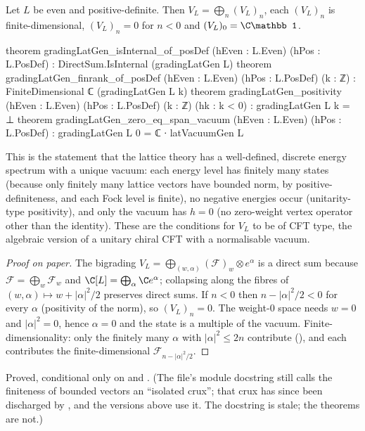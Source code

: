 \begin{theorem}\label{ch03:thm:gradingLat}
Let $L$ be even and positive-definite. Then $V_L=\bigoplus_n(V_L)_n$, each $(V_L)_n$ is
finite-dimensional, $(V_L)_n=0$ for $n<0$ and $(V_L)_0=\C\mathbb 1$.
\end{theorem}
\begin{leancode}
theorem gradingLatGen_isInternal_of_posDef (hEven : L.Even) (hPos : L.PosDef) :
    DirectSum.IsInternal (gradingLatGen L)
theorem gradingLatGen_finrank_of_posDef (hEven : L.Even) (hPos : L.PosDef) (k : ℤ) :
    FiniteDimensional ℂ (gradingLatGen L k)
theorem gradingLatGen_positivity (hEven : L.Even) (hPos : L.PosDef) (k : ℤ) (hk : k < 0) :
    gradingLatGen L k = ⊥
theorem gradingLatGen_zero_eq_span_vacuum (hEven : L.Even) (hPos : L.PosDef) :
    gradingLatGen L 0 = ℂ ∙ latVacuumGen L
\end{leancode}

\begin{physics}
This is the statement that the lattice theory has a well-defined, discrete energy spectrum with a unique vacuum: each energy level has finitely many states (because only finitely many lattice vectors have bounded norm, by positive-definiteness, and each Fock level is finite), no negative energies occur (unitarity-type positivity), and only the vacuum has $h=0$ (no zero-weight vertex operator other than the identity). These are the conditions for $V_L$ to be of CFT type, the algebraic version of a unitary chiral CFT with a normalisable vacuum.
\end{physics}
\begin{proof}[Proof on paper]
The bigrading $V_L=\bigoplus_{(w,\alpha)}(\mathcal F)_w\otimes e^\alpha$ is a direct sum because
$\mathcal F=\bigoplus_w\mathcal F_w$ and $\C[L]=\bigoplus_\alpha\C e^\alpha$; collapsing along the
fibres of $(w,\alpha)\mapsto w+|\alpha|^2/2$ preserves direct sums. If $n<0$ then
$n-|\alpha|^2/2<0$ for every $\alpha$ (positivity of the norm), so $(V_L)_n=0$. The weight-$0$
space needs $w=0$ and $|\alpha|^2=0$, hence $\alpha=0$ and the state is a multiple of the vacuum.
Finite-dimensionality: only the finitely many $\alpha$ with $|\alpha|^2\le2n$ contribute
(), and each contributes the finite-dimensional $\mathcal F_{n-|\alpha|^2/2}$.
\end{proof}
\begin{status}
Proved, conditional only on  and . (The file's module docstring still
calls the finiteness of bounded vectors an ``isolated crux''; that crux has since been
discharged by , and the  versions above use it. The
docstring is stale; the theorems are not.)
\end{status}

